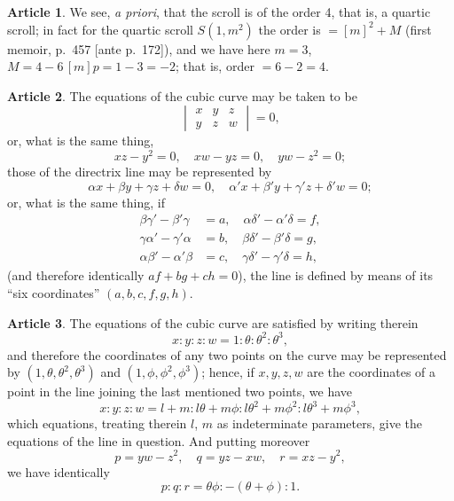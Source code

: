 \documentclass[12pt,a4paper]{article}
\theoremstyle{definition}
\newtheorem{art}{Article}[section]
\begin{document}
\begin{art}
We see, \textit{a priori}, that the scroll is of the order 4, that is, a quartic scroll; in fact for the quartic scroll $S(1, m^2)$ the order is $= [m]^2 + M$ (first memoir, p.~457 [ante p.~172]), and we have here $m = 3$, $M = 4 - 6\,[m]p = 1 - 3 = -2$; that is, order $= 6 - 2 = 4$.
\end{art}

\begin{art}
The equations of the cubic curve may be taken to be
\[
\begin{vmatrix} x & y & z \\ y & z & w \end{vmatrix} = 0,
\]
or, what is the same thing,
\[
xz - y^2 = 0, \quad xw - yz = 0, \quad yw - z^2 = 0;
\]
those of the directrix line may be represented by
\[
\alpha x + \beta y + \gamma z + \delta w = 0, \quad \alpha' x + \beta' y + \gamma' z + \delta' w = 0;
\]
or, what is the same thing, if
\begin{align*}
\beta\gamma' - \beta'\gamma &= a, \quad \alpha\delta' - \alpha'\delta = f, \\
\gamma\alpha' - \gamma'\alpha &= b, \quad \beta\delta' - \beta'\delta = g, \\
\alpha\beta' - \alpha'\beta &= c, \quad \gamma\delta' - \gamma'\delta = h,
\end{align*}
(and therefore identically $af + bg + ch = 0$), the line is defined by means of its ``six coordinates'' $(a, b, c, f, g, h)$.
\end{art}

\begin{art}
The equations of the cubic curve are satisfied by writing therein
\[
x : y : z : w = 1 : \theta : \theta^2 : \theta^3,
\]
and therefore the coordinates of any two points on the curve may be represented by $(1, \theta, \theta^2, \theta^3)$ and $(1, \phi, \phi^2, \phi^3)$; hence, if $x, y, z, w$ are the coordinates of a point in the line joining the last mentioned two points, we have
\[
x : y : z : w = l + m : l\theta + m\phi : l\theta^2 + m\phi^2 : l\theta^3 + m\phi^3,
\]
which equations, treating therein $l$, $m$ as indeterminate parameters, give the equations of the line in question. And putting moreover
\[
p = yw - z^2, \quad q = yz - xw, \quad r = xz - y^2,
\]
we have identically
\[
p : q : r = \theta\phi : -(\theta + \phi) : 1.
\]
\end{art}
\end{document}
